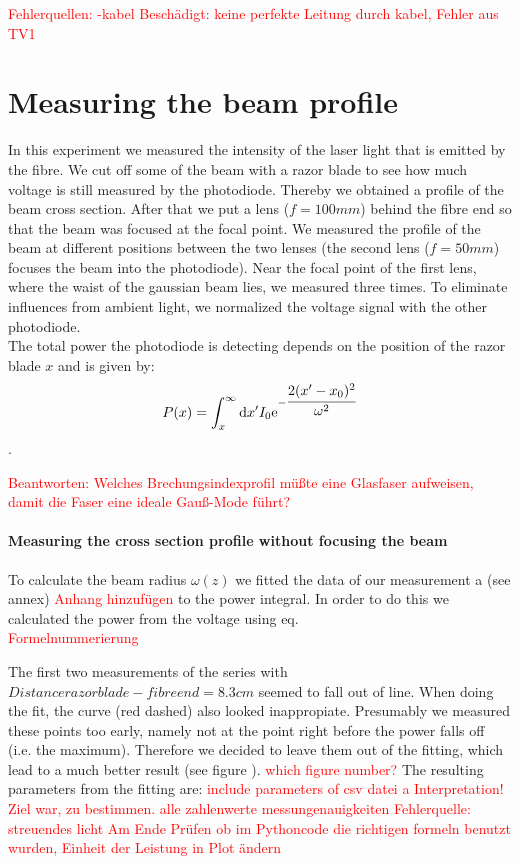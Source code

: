 \documentclass{article}
\begin{document}
\textcolor{red}{Fehlerquellen:
-kabel Beschädigt: keine perfekte Leitung durch kabel, Fehler aus TV1}

\section{Measuring the beam profile}

In this experiment we measured the intensity of the laser light that is emitted by the fibre. We cut off some of the beam with a razor blade to see how much voltage is still measured by the photodiode. Thereby we obtained a profile of the beam cross section. After that we put a lens ($f=100mm$) behind the fibre end so that the beam was focused at the focal point. We measured the profile of the beam at different positions between the two lenses (the second lens ($f=50mm$) focuses the beam into the photodiode). Near the focal point of the first lens, where the waist of the gaussian beam lies, we measured three times. To eliminate influences from ambient light, we normalized the voltage signal with the other photodiode.\\

The total power the photodiode is detecting depends on the position of the razor blade $x$ and is given by:
\[ P(x) = \int_x^\infty\mathrm{d}x' I_0 \mathrm{e}^{-\cfrac{2(x'-x_0)^2}{\omega^2}} \].

\textcolor{red}{Beantworten: Welches Brechungsindexprofil müßte eine Glasfaser aufweisen, damit die Faser eine ideale Gauß-Mode führt?}

\paragraph{Measuring the cross section profile without focusing the beam}

To calculate the beam radius $\omega (z)$ we fitted the data of our measurement a (see annex)
\textcolor{red}{Anhang hinzufügen} %
to the power integral. In order to do this we calculated the power from the voltage using eq. \\
\textcolor{red}{Formelnummerierung}

The first two measurements of the series with $Distance razor blade - fibre end = 8.3 cm$ seemed to fall out of line. When doing the fit, the curve (red dashed) also looked inappropiate. Presumably we measured these points too early, namely not at the point right before the power falls off (i.e. the maximum). Therefore we decided to leave them out of the fitting, which lead to a much better result (see figure ).
\textcolor{red}{which figure number?}
The resulting parameters from the fitting are:
\textcolor{red}{
include parameters of csv datei a
Interpretation! Ziel war, \omega zu bestimmen.
alle zahlenwerte
messungenauigkeiten
Fehlerquelle: streuendes licht
Am Ende Prüfen ob im Pythoncode die richtigen formeln benutzt wurden, Einheit der Leistung in Plot ändern}
\end{document}
